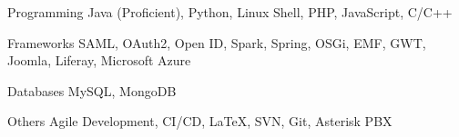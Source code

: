 

\begin{cvskills}

  \cvskill
    {Programming} %
    {Java (Proficient), Python, Linux Shell, PHP, JavaScript, C/C++} %

  \cvskill
    {Frameworks} %
    {SAML, OAuth2, Open ID, Spark, Spring, OSGi, EMF, GWT, Joomla, Liferay, Microsoft Azure} %

  \cvskill
    {Databases} %
    {MySQL, MongoDB} %


  \cvskill
  {Others} %
  {Agile Development, CI/CD, {\LaTeX}, SVN, Git, Asterisk PBX} %
  
\end{cvskills}

